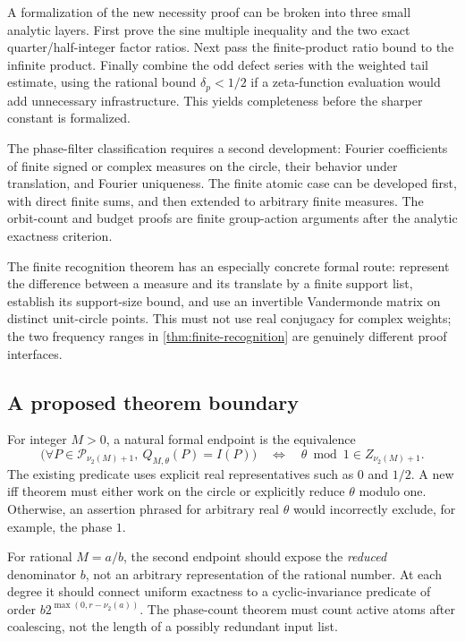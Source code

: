 \documentclass[11pt,a4paper]{article}
\numberwithin{equation}{section}
\theoremstyle{plain}
\theoremstyle{definition}
\theoremstyle{remark}
\newcommand{\Poly}{\mathcal P}
\begin{document}
A formalization of the new necessity proof can be broken into three
small analytic layers. First prove the sine multiple inequality and the
two exact quarter/half-integer factor ratios. Next pass the finite-product
ratio bound to the infinite product. Finally combine the odd defect series
with the weighted tail estimate, using the rational bound
$\delta_p<1/2$ if a zeta-function evaluation would add unnecessary
infrastructure. This yields completeness before the sharper constant is
formalized.

The phase-filter classification requires a second development: Fourier
coefficients of finite signed or complex measures on the circle, their
behavior under translation, and Fourier uniqueness. The finite atomic
case can be developed first, with direct finite sums, and then extended
to arbitrary finite measures. The orbit-count and budget proofs are
finite group-action arguments after the analytic exactness criterion.

The finite recognition theorem has an especially concrete formal route:
represent the difference between a measure and its translate by a finite
support list, establish its support-size bound, and use an invertible
Vandermonde matrix on distinct unit-circle points. This must not use real
conjugacy for complex weights; the two frequency ranges in
\cref{thm:finite-recognition} are genuinely different proof interfaces.

\subsection{A proposed theorem boundary}

For integer $M>0$, a natural formal endpoint is the equivalence
\[
 \bigl(\forall P\in\Poly_{\nu_2(M)+1},\ Q_{M,\theta}(P)=I(P)\bigr)
 \quad\Longleftrightarrow\quad \theta\bmod1\in Z_{\nu_2(M)+1}.
\]
The existing predicate uses explicit real representatives such as $0$ and
$1/2$. A new iff theorem must either work on the circle or explicitly
reduce $\theta$ modulo one. Otherwise, an assertion phrased for arbitrary
real $\theta$ would incorrectly exclude, for example, the phase $1$.

For rational $M=a/b$, the second endpoint should expose the \emph{reduced}
denominator $b$, not an arbitrary representation of the rational number.
At each degree it should connect uniform exactness to a cyclic-invariance
predicate of order $b2^{\max(0,r-\nu_2(a))}$. The phase-count theorem
must count active atoms after coalescing, not the length of a possibly
redundant input list.
\end{document}
